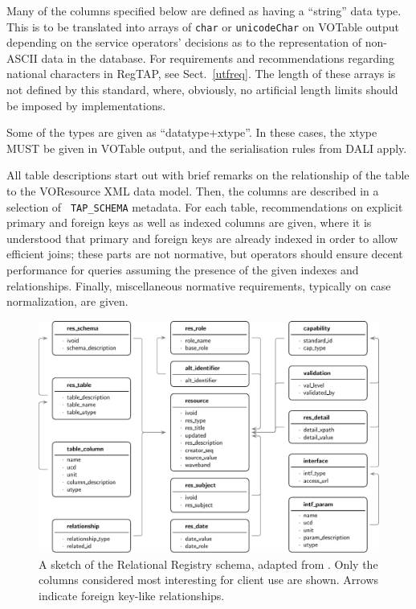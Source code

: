 \documentclass[11pt,a4paper]{ivoa}
\newcommand{\tapent}[1]{\texttt{\color{tapcolor} #1}}
\begin{document}
Many of the columns specified below are defined as having a ``string'' 
data type.  This is to be translated into arrays of \texttt{char} or
\texttt{unicodeChar} on VOTable output depending on the service
operators' decisions as to the representation of non-ASCII data in the
database.  For requirements and recommendations regarding national
characters in RegTAP, see Sect.~\ref{utfreq}.  The length of these
arrays is not defined by this standard, where, obviously, no artificial
length limits should be imposed by implementations.

Some of the types are given as ``datatype+xtype''.  In these cases, the
xtype MUST be given in VOTable output, and the serialisation rules from
DALI \citep{2017ivoa.spec.0517D} apply.

All table descriptions start out with brief remarks on the
relationship of the table to the VOResource XML data model.  Then, the
columns are described in a selection of \tapent{TAP\_SCHEMA} metadata. For each
table, recommendations on explicit primary and foreign keys as well as
indexed columns are given, where it is understood that primary and
foreign keys are already indexed in order to allow efficient joins;
these parts are not normative, but operators should ensure decent
performance for queries assuming the presence of the given indexes and
relationships.  Finally, miscellaneous normative requirements, typically
on case normalization, are given.


\begin{figure}

\includegraphics[width=\textwidth]{schema.pdf}
\caption{A sketch of the
Relational Registry schema, adapted from \citet{regtap-adass}.  
Only the columns considered
most interesting for client use are shown.  Arrows indicate foreign
key-like relationships.}
\end{figure}
\end{document}
